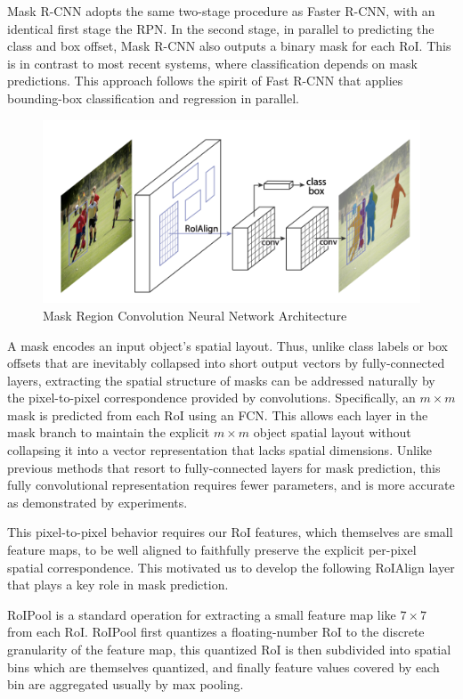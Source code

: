 Mask R-CNN adopts the same two-stage procedure as Faster R-CNN, with an identical first stage the RPN. In the second stage, in parallel to predicting 
the class and box offset, Mask R-CNN also outputs a binary mask for each RoI. This is in contrast to most recent systems, where classification 
depends on mask predictions. This approach follows the spirit of Fast R-CNN that applies bounding-box classification and regression in parallel.


\begin{figure}[h!]
    \centering
    \includegraphics[scale=0.5]{Figures/mask-r-cnn.png}
    \caption{Mask Region Convolution Neural Network Architecture}
    \label{fig:mask-r-cnn}
\end{figure}

\newpage
A mask encodes an input object’s spatial layout. Thus, unlike class labels or box offsets that are inevitably collapsed into short output vectors by
fully-connected layers, extracting the spatial structure of masks can be addressed naturally by the pixel-to-pixel correspondence provided by convolutions.
Specifically, an $m \times m$ mask is predicted from each RoI using an FCN. This allows each layer in the mask branch to maintain the explicit $m \times m$ object 
spatial layout without collapsing it into a vector representation that lacks spatial dimensions. Unlike previous methods that resort to fully-connected layers 
for mask prediction, this fully convolutional representation requires fewer parameters, and is more accurate as demonstrated by experiments.

This pixel-to-pixel behavior requires our RoI features, which themselves are small feature maps, to be well aligned to faithfully preserve the explicit 
per-pixel spatial correspondence. This motivated us to develop the following RoIAlign layer that plays a key role in mask prediction.

RoIPool is a standard operation for extracting a small feature map like \(7 \times 7\) from each RoI. RoIPool first quantizes a floating-number RoI to the 
discrete granularity of the feature map, this quantized RoI is then subdivided into spatial bins  which are themselves quantized, and finally feature 
values covered by each bin are aggregated usually by max pooling. 

